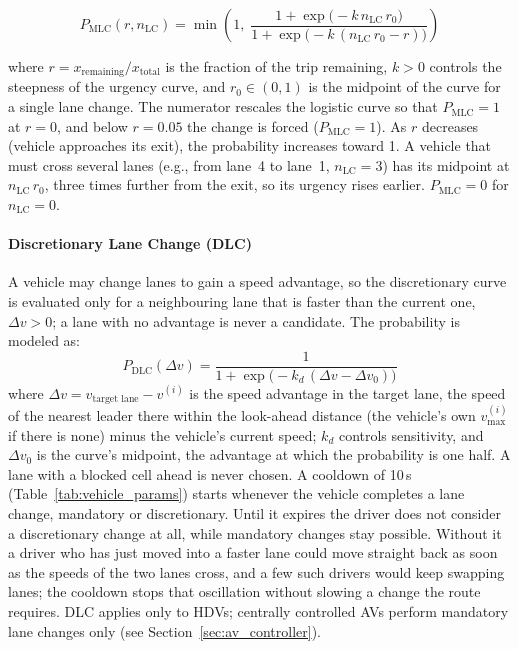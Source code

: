 \documentclass[review,number]{elsarticle}
\begin{document}
\begin{equation}
    P_{\text{MLC}}(r, n_{\text{LC}}) = \min\!\left(1,\; \frac{1 + \exp\!\big(-k\, n_{\text{LC}}\, r_0\big)}{1 + \exp\!\big(-k\,(n_{\text{LC}}\, r_0 - r)\big)}\right)
    \label{eq:mlc_logistic}
\end{equation}

where $r = x_{\text{remaining}} / x_{\text{total}}$ is the fraction of the trip remaining, $k > 0$ controls the steepness of the urgency curve, and $r_0 \in (0, 1)$ is the midpoint of the curve for a single lane change. The numerator rescales the logistic curve so that $P_{\text{MLC}} = 1$ at $r = 0$, and below $r = 0.05$ the change is forced ($P_{\text{MLC}} = 1$). As $r$ decreases (vehicle approaches its exit), the probability increases toward 1. A vehicle that must cross several lanes (e.g., from lane~4 to lane~1, $n_{\text{LC}} = 3$) has its midpoint at $n_{\text{LC}}\, r_0$, three times further from the exit, so its urgency rises earlier. $P_{\text{MLC}} = 0$ for $n_{\text{LC}} = 0$.

\paragraph{Discretionary Lane Change (DLC)}
A vehicle may change lanes to gain a speed advantage, so the discretionary curve is evaluated only for a neighbouring lane that is faster than the current one, $\Delta v > 0$; a lane with no advantage is never a candidate. The probability is modeled as:
\begin{equation}
    P_{\text{DLC}}(\Delta v) = \frac{1}{1 + \exp\!\big(-k_d\,(\Delta v - \Delta v_0)\big)}
    \label{eq:dlc_logistic}
\end{equation}
where $\Delta v = v_{\text{target lane}} - v^{(i)}$ is the speed advantage in the target lane, the speed of the nearest leader there within the look-ahead distance (the vehicle's own $v_{\max}^{(i)}$ if there is none) minus the vehicle's current speed; $k_d$ controls sensitivity, and $\Delta v_0$ is the curve's midpoint, the advantage at which the probability is one half. A lane with a blocked cell ahead is never chosen. A cooldown of 10\,s (Table~\ref{tab:vehicle_params}) starts whenever the vehicle completes a lane change, mandatory or discretionary. Until it expires the driver does not consider a discretionary change at all, while mandatory changes stay possible. Without it a driver who has just moved into a faster lane could move straight back as soon as the speeds of the two lanes cross, and a few such drivers would keep swapping lanes; the cooldown stops that oscillation without slowing a change the route requires. DLC applies only to HDVs; centrally controlled AVs perform mandatory lane changes only (see Section~\ref{sec:av_controller}).
\end{document}
